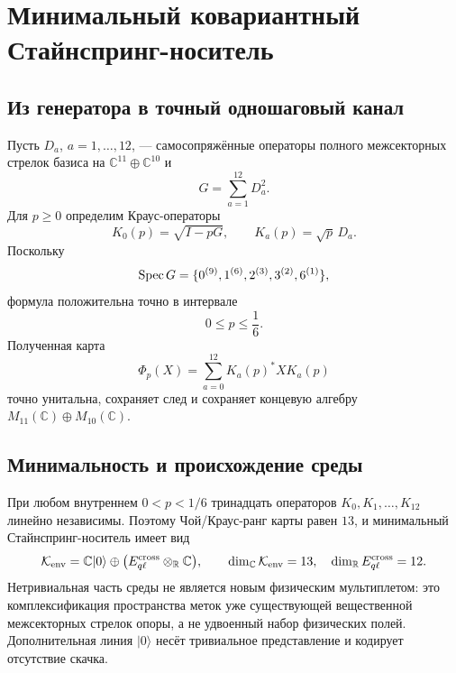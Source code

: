 \chapter{Минимальный ковариантный Стайнспринг-носитель}
\label{ch:v8-minimal-covariant-stinespring-carrier-gate}

\section{Из генератора в точный одношаговый канал}

Пусть $D_a$, $a=1,\ldots,12$, --- самосопряжённые операторы полного
межсекторных стрелок базиса на $\mathbb C^{11}\oplus\mathbb C^{10}$ и
\begin{equation}
 G=\sum_{a=1}^{12}D_a^2.
\end{equation}
Для $p\geq0$ определим Краус-операторы
\begin{equation}
 K_0(p)=\sqrt{I-pG},
 \qquad
 K_a(p)=\sqrt p\,D_a.
 \label{eq:v8-one-step-stinespring-kraus}
\end{equation}
Поскольку
\begin{equation}
 \operatorname{Spec} G=\{0^{(9)},1^{(6)},2^{(3)},3^{(2)},6^{(1)}\},
\end{equation}
формула положительна точно в интервале
\begin{equation}
 0\leq p\leq\frac16.
 \label{eq:v8-stinespring-step-window}
\end{equation}
Полученная карта
\begin{equation}
 \Phi_p(X)=\sum_{a=0}^{12}K_a(p)^*XK_a(p)
 \label{eq:v8-exact-one-step-channel}
\end{equation}
точно унитальна, сохраняет след и сохраняет концевую алгебру
$M_{11}(\mathbb C)\oplus M_{10}(\mathbb C)$.

\section{Минимальность и происхождение среды}

При любом внутреннем $0<p<1/6$ тринадцать операторов
$K_0,K_1,\ldots,K_{12}$ линейно независимы. Поэтому Чой/Краус-ранг карты
равен $13$, и минимальный Стайнспринг-носитель имеет вид
\begin{equation}
 \mathcal K_{\rm env}
 =\mathbb C|0\rangle\oplus
 \bigl(E_{q\ell}^{\rm cross}\otimes_{\mathbb R}\mathbb C\bigr),
 \qquad \dim_{\mathbb C}\mathcal K_{\rm env}=13,
 \quad \dim_{\mathbb R}E_{q\ell}^{\rm cross}=12.
 \label{eq:v8-minimal-environment-carrier}
\end{equation}
Нетривиальная часть среды не является новым физическим мультиплетом: это
комплексификация пространства меток уже существующей вещественной
межсекторных стрелок опоры, а не удвоенный набор физических полей. Дополнительная линия
$|0\rangle$ несёт тривиальное представление и кодирует отсутствие скачка.

